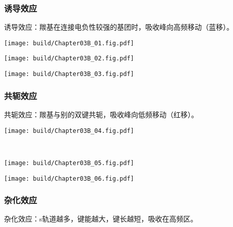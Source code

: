 \subsubsection{诱导效应}
诱导效应：羰基在连接电负性较强的基团时，吸收峰向高频移动（蓝移）。
\begin{Figure}[诱导效应]
    \begin{FigureSub}[\SI{1812}{cm^{-1}};溴羰基]
        \texttt{[image: build/Chapter03B\_01.fig.pdf]}
    \end{FigureSub}
    \hspace{1cm}
    \begin{FigureSub}[\SI{1815}{cm^{-1}};氯羰基]
        \texttt{[image: build/Chapter03B\_02.fig.pdf]}
    \end{FigureSub}
    \hspace{1cm}
    \begin{FigureSub}[\SI{1869}{cm^{-1}};氟羰基]
        \texttt{[image: build/Chapter03B\_03.fig.pdf]}
    \end{FigureSub}
\end{Figure}

\subsubsection{共轭效应}
共轭效应：羰基与别的双键共轭，吸收峰向低频移动（红移）。
\begin{Figure}[共轭效应]
    \begin{FigureSub}[\SI{1715}{cm^{-1}};无苯]
        \texttt{[image: build/Chapter03B\_04.fig.pdf]}
    \end{FigureSub}\\ \vspace{0.5cm}
    \begin{FigureSub}[\SI{1685}{cm^{-1}};1苯]
        \texttt{[image: build/Chapter03B\_05.fig.pdf]}
    \end{FigureSub}\hspace{1.5cm}
    \begin{FigureSub}[\SI{1660}{cm^{-1}};2苯]
        \texttt{[image: build/Chapter03B\_06.fig.pdf]}
    \end{FigureSub}
\end{Figure}

\subsubsection{杂化效应}
杂化效应：s轨道越多，键能越大，键长越短，吸收在高频区。
\begin{Figure}[杂化效应]
    \begin{FigureSub}[\SI{1430}{cm^{-1}};单键]
    \end{FigureSub}
    \hspace{1cm}
    \begin{FigureSub}[\SI{1660}{cm^{-1}};双键]
    \end{FigureSub}
    \hspace{1cm}
    \begin{FigureSub}[\SI{2220}{cm^{-1}};三键]
    \end{FigureSub}
\end{Figure}

